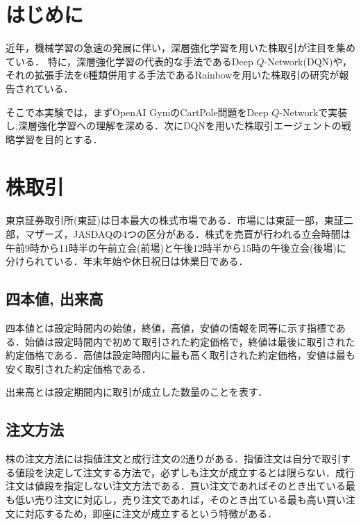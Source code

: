 \documentclass[twocolumn]{jarticle}
\begin{document}

\section{はじめに}
近年，機械学習の急速の発展に伴い，深層強化学習を用いた株取引が注目を集めている．
特に，深層強化学習の代表的な手法であるDeep $Q$-Network(DQN)や，それの拡張手法を6種類併用する手法であるRainbowを用いた株取引の研究\cite{d_mori}が報告されている．

そこで本実験では，まずOpenAI GymのCartPole問題をDeep $Q$-Networkで実装し,深層強化学習への理解を深める．次にDQNを用いた株取引エージェントの戦略学習を目的とする．

\section{株取引}
    東京証券取引所(東証)は日本最大の株式市場である．市場には東証一部，東証二部，マザーズ，JASDAQの4つの区分がある．株式を売買が行われる立会時間は午前9時から11時半の午前立会(前場)と午後12時半から15時の午後立会(後場)に分けられている．年末年始や休日祝日は休業日である．

    \subsection{四本値, 出来高}
    四本値とは設定時間内の始値，終値，高値，安値の情報を同等に示す指標である．始値は設定時間内で初めて取引された約定価格で，終値は最後に取引された約定価格である．高値は設定時間内に最も高く取引された約定価格，安値は最も安く取引された約定価格である．
    
    出来高とは設定期間内に取引が成立した数量のことを表す．

    \subsection{注文方法}
    株の注文方法には指値注文と成行注文の2通りがある．指値注文は自分で取引する値段を決定して注文する方法で，必ずしも注文が成立するとは限らない．成行注文は値段を指定しない注文方法である．買い注文であればそのとき出ている最も低い売り注文に対応し，売り注文であれば，そのとき出ている最も高い買い注文に対応するため，即座に注文が成立するという特徴がある．
    
\end{document}
